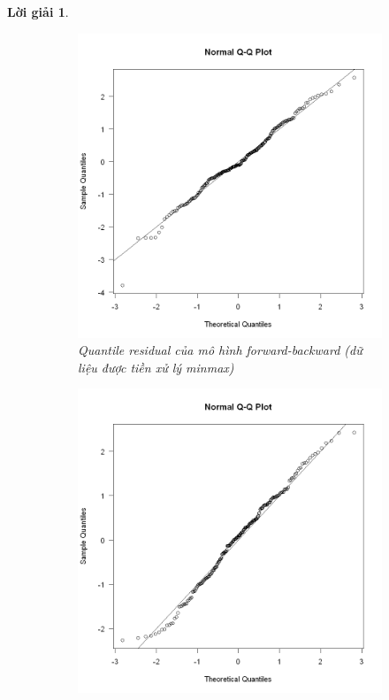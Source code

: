 \documentclass[14pt, a4paper]{article}
\theoremstyle{sltheorem}
\theoremstyle{soltheorem}
\newtheorem*{loigiai}{Lời giải}
\begin{document}
\begin{loigiai}
    \begin{figure}[h!]
        \centering
        \begin{subfigure}[b]{0.4\textwidth}
            \centering
            \includegraphics[width=\textwidth]{figures/minmax_mbo_quantile_resid.png}
            \caption{Quantile residual của mô hình forward-backward (dữ liệu được tiền xử lý minmax)}
        \end{subfigure}
        \hfill
        \begin{subfigure}[b]{0.4\textwidth}
            \centering
            \includegraphics[width=\textwidth]{figures/standardize_mbo_quantile_resid.png}

\end{subfigure}
\end{figure}
\end{loigiai}
\end{document}
